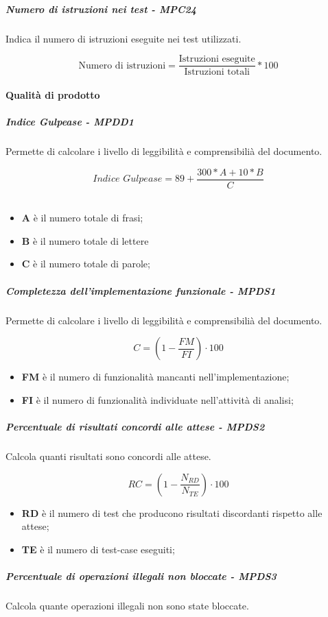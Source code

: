 \subparagraph{Numero di istruzioni nei test - MPC24}
Indica il numero di istruzioni eseguite nei test utilizzati.

\begin{equation*}
\text{Numero di istruzioni} = \frac{\text{Istruzioni eseguite}}{\text{Istruzioni totali}} * 100
\end{equation*}


\paragraph{Qualità di prodotto}
\subparagraph{Indice Gulpease - MPDD1}
Permette di calcolare i livello di leggibilità e comprensibilià del documento.

\begin{equation*}\textit{Indice Gulpease} = 89 + \frac{300 * \textit{A} + 10 * B}{C}\end{equation*} \\
\begin{itemize}
	\item \textbf{A} è il numero totale di frasi;
	\item \textbf{B} è il numero totale di lettere
	\item \textbf{C} è il numero totale di parole;
\end{itemize}
\subparagraph{Completezza dell’implementazione funzionale - MPDS1}
Permette di calcolare i livello di leggibilità e comprensibilià del documento.

\begin{equation*}
C=(1-\frac{FM}{FI})\cdot 100
\end{equation*}
\begin{itemize}
	\item \textbf{FM} è il numero di funzionalità mancanti nell'implementazione;
	\item \textbf{FI} è il numero di funzionalità individuate nell'attività di analisi;
\end{itemize}
\subparagraph{Percentuale di risultati concordi alle attese - MPDS2}
Calcola quanti risultati sono concordi alle attese.

\begin{equation*} RC = (1-\frac{N_{RD}}{N_{TE}}) \cdot 100 \end{equation*}
\begin{itemize}
	\item \textbf{RD} è il numero di test che producono risultati discordanti rispetto alle attese;
	\item \textbf{TE}  è il numero di test-case eseguiti;
\end{itemize}
\subparagraph{Percentuale di operazioni illegali non bloccate - MPDS3}
Calcola quante operazioni illegali non sono state bloccate.

